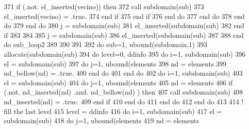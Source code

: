 \begin{DoxyCode}
371                     \textcolor{keywordflow}{if} (.not. el\_inserted(vecino)) \textcolor{keywordflow}{then}
372                       \textcolor{keyword}{call }subdomain(sub)%
373                       el\_inserted(vecino) = .true.
374 \textcolor{keywordflow}{                    end if}
375 \textcolor{keywordflow}{                  end if}
376 \textcolor{keywordflow}{                end do}
377 \textcolor{keywordflow}{              end do}
378 \textcolor{keywordflow}{            end do}
379 \textcolor{keywordflow}{          end do}
380           j = subdomain(sub)%
381           el\_inserted(subdomain(sub)%
382 \textcolor{keywordflow}{        end if}
383         
384         
385         j = subdomain(sub)%
386         el\_inserted(subdomain(sub)%
387 
388 \textcolor{keywordflow}{      end do} sub\_loop2
389 
390         
391             
392       \textcolor{keywordflow}{do} sub=1, ubound(subdomain,1)
393         \textcolor{keyword}{allocate}(subdomain(sub)%
394         \textcolor{keywordflow}{do} level=0, ddinfo%
395           \textcolor{keywordflow}{do} i=1, subdomain(sub)%
396             el = subdomain(sub)%
397             \textcolor{keywordflow}{do} j=1, ubound(elements%
398               nd = elements%
399               nd\_bellow(nd) = .true.
400 \textcolor{keywordflow}{            end do}
401 \textcolor{keywordflow}{          end do}
402           \textcolor{keywordflow}{do} i=1, subdomain(sub)%
403             el = subdomain(sub)%
404             \textcolor{keywordflow}{do} j=1, ubound(elements%
405               nd = elements%
406               \textcolor{keywordflow}{if} (.not. nd\_inserted(nd) .and. nd\_bellow(nd) ) \textcolor{keywordflow}{then}
407                 \textcolor{keyword}{call }subdomain(sub)%
408                 nd\_inserted(nd) = .true.
409 \textcolor{keywordflow}{              end if}
410 \textcolor{keywordflow}{            end do}
411 \textcolor{keywordflow}{          end do}
412 \textcolor{keywordflow}{        end do}
413         
414         \textcolor{comment}{! fill the last level}
415         level = ddinfo%
416         \textcolor{keywordflow}{do} i=1, subdomain(sub)%
417           el = subdomain(sub)%
418           \textcolor{keywordflow}{do} j=1, ubound(elements%
419             nd = elements%

\end{DoxyCode}
